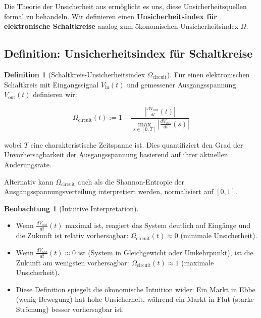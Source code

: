 \documentclass[a4paper, 12pt, twoside, openright]{report}
\theoremstyle{definition}
\newtheorem{definition}[theorem]{Definition}
\newtheorem{beobachtung}{Beobachtung}
\theoremstyle{definition}
\begin{document}
Die Theorie der Unsicherheit aus \cite{epp_signal} ermöglicht es uns, diese Unsicherheitsquellen formal zu behandeln. Wir definieren einen \textbf{Unsicherheitsindex für elektronische Schaltkreise} analog zum ökonomischen Unsicherheitsindex $\Omega$.

\subsection{Definition: Unsicherheitsindex für Schaltkreise}

\begin{definition}[Schaltkreis-Unsicherheitsindex $\Omega_{\text{circuit}}$]
Für einen elektronischen Schaltkreis mit Eingangssignal $V_{\text{in}}(t)$ und gemessener Ausgangsspannung $V_{\text{out}}(t)$ definieren wir:

\begin{equation}
\Omega_{\text{circuit}}(t) := 1 - \frac{|\frac{dV_{\text{out}}}{dt}(t)|}{\max_{s \in [0,T]} |\frac{dV_{\text{out}}}{dt}(s)|}
\end{equation}

wobei $T$ eine charakteristische Zeitspanne ist. Dies quantifiziert den Grad der Unvorhersagbarkeit der Ausgangsspannung basierend auf ihrer aktuellen Änderungsrate.

Alternativ kann $\Omega_{\text{circuit}}$ auch als die Shannon-Entropie der Ausgangsspannungsverteilung interpretiert werden, normalisiert auf $[0,1]$.
\end{definition}

\begin{beobachtung}[Intuitive Interpretation]

\begin{itemize}
    \item Wenn $\frac{dV_{\text{out}}}{dt}(t)$ maximal ist, reagiert das System deutlich auf Eingänge und die Zukunft ist relativ vorhersagbar: $\Omega_{\text{circuit}}(t) \approx 0$ (minimale Unsicherheit).
    \item Wenn $\frac{dV_{\text{out}}}{dt}(t) \approx 0$ ist (System in Gleichgewicht oder Umkehrpunkt), ist die Zukunft am wenigsten vorhersagbar: $\Omega_{\text{circuit}}(t) \approx 1$ (maximale Unsicherheit).
    \item Diese Definition spiegelt die ökonomische Intuition wider: Ein Markt in Ebbe (wenig Bewegung) hat hohe Unsicherheit, während ein Markt in Flut (starke Strömung) besser vorhersagbar ist.
\end{itemize}

\end{beobachtung}
\end{document}
